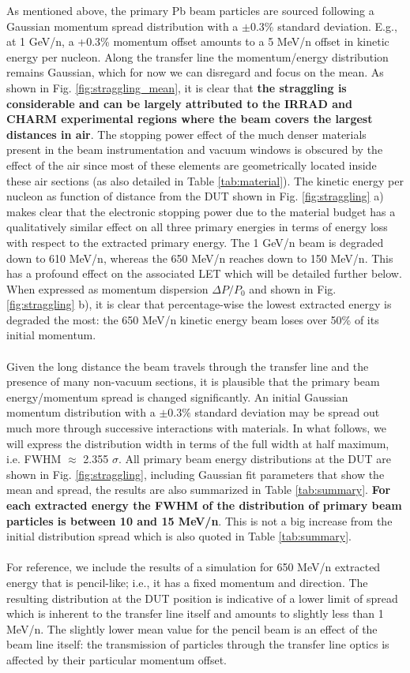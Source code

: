As mentioned above, the primary Pb beam particles are sourced following a Gaussian momentum spread distribution with a $\pm 0.3\%$ standard deviation. E.g., at 1 GeV/n, a +0.3\% momentum offset amounts to a 5 MeV/n offset in kinetic energy per nucleon. Along the transfer line the momentum/energy distribution remains Gaussian, which for now we can disregard and focus on the mean. As shown in Fig. \ref{fig:straggling_mean}, it is clear that \textbf{the straggling is considerable and can be largely attributed to the IRRAD and CHARM experimental regions where the beam covers the largest distances in air}. The stopping power effect of the much denser materials present in the beam instrumentation and vacuum windows is obscured by the effect of the air since most of these elements are geometrically located inside these air sections (as also detailed in Table \ref{tab:material}). The kinetic energy per nucleon as function of distance from the DUT shown in Fig. \ref{fig:straggling} a) makes clear that the electronic stopping power due to the material budget has a qualitatively similar effect on all three primary energies in terms of energy loss with respect to the extracted primary energy. The 1 GeV/n beam is degraded down to 610 MeV/n, whereas the 650 MeV/n reaches down to 150 MeV/n. This has a profound effect on the associated LET which will be detailed further below. When expressed as momentum dispersion $\Delta P/P_0$ and shown in Fig. \ref{fig:straggling} b), it is clear that percentage-wise the lowest extracted energy is degraded the most: the 650 MeV/n kinetic energy beam loses over 50\% of its initial momentum.\\
\\
Given the long distance the beam travels through the transfer line and the presence of many non-vacuum sections, it is plausible that the primary beam energy/momentum spread is changed significantly. An initial Gaussian momentum distribution with a $\pm 0.3\%$ standard deviation may be spread out much more through successive interactions with materials. In what follows, we will express the distribution width in terms of the full width at half maximum, i.e. FWHM $\approx$ 2.355 $\sigma$. All primary beam energy distributions at the DUT are shown in Fig. \ref{fig:straggling}, including Gaussian fit parameters that show the mean and spread, the results are also summarized in Table \ref{tab:summary}. \textbf{For each extracted energy the FWHM of the distribution of primary beam particles is between 10 and 15 MeV/n}. This is not a big increase from the initial distribution spread which is also quoted in Table \ref{tab:summary}. \\
\\
For reference, we include the results of a simulation for 650 MeV/n extracted energy that is pencil-like; i.e., it has a fixed momentum and direction. The resulting distribution at the DUT position is indicative of a lower limit of spread which is inherent to the transfer line itself and amounts to slightly less than 1 MeV/n. The slightly lower mean value for the pencil beam is an effect of the beam line itself: the transmission of particles through the transfer line optics is affected by their particular momentum offset.

